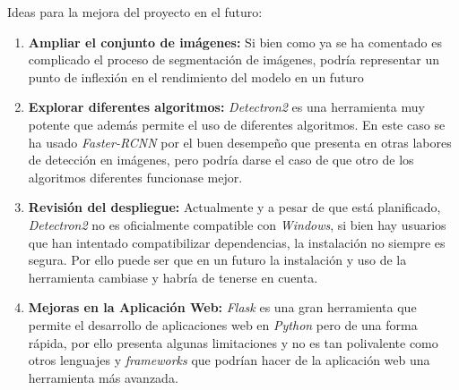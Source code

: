 Ideas para la mejora del proyecto en el futuro:

\begin{enumerate}
    \item \textbf{Ampliar el conjunto de imágenes:} Si bien como ya se ha comentado es complicado el proceso de segmentación de imágenes, podría representar un punto de inflexión en el rendimiento del modelo en un futuro
    \item \textbf{Explorar diferentes algoritmos:} \emph{Detectron2} es una herramienta muy potente que además permite el uso de diferentes algoritmos. En este caso se ha usado \emph{Faster-RCNN} por el buen desempeño que presenta en otras labores de detección en imágenes, pero podría darse el caso de que otro de los algoritmos diferentes funcionase mejor.
    \item \textbf{Revisión del despliegue:} Actualmente y a pesar de que está planificado, \emph{Detectron2} no es oficialmente compatible con \emph{Windows}, si bien hay usuarios que han intentado compatibilizar dependencias, la instalación no siempre es segura. Por ello puede ser que en un futuro la instalación y uso de la herramienta cambiase y habría de tenerse en cuenta.
    \item \textbf{Mejoras en la Aplicación Web:} \emph{Flask} es una gran herramienta que permite el desarrollo de aplicaciones web en \emph{Python} pero de una forma rápida, por ello presenta algunas limitaciones y no es tan polivalente como otros lenguajes y \emph{frameworks} que podrían hacer de la aplicación web una herramienta más avanzada.
    
\end{enumerate}